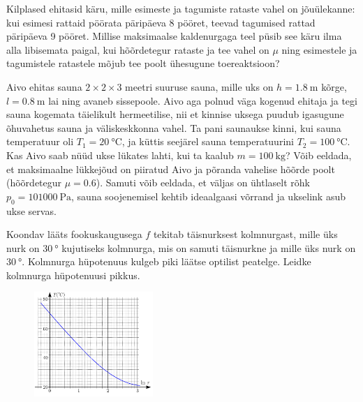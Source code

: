 \documentclass[10pt]{article}
\begin{document}

Kilplased ehitasid käru, mille esimeste ja tagumiste rataste vahel on jõuülekanne: kui esimesi rattaid pöörata päripäeva 8 pööret, teevad tagumised rattad päripäeva 9 pööret. Millise maksimaalse kaldenurgaga teel püsib see käru ilma alla libisemata paigal, kui hõõrdetegur rataste ja tee vahel on  $\mu$ ning esimestele ja tagumistele ratastele mõjub tee poolt ühesugune  toereaktsioon?
\probend
\bigskip


Aivo ehitas sauna $2\times 2\times 3$ meetri suuruse sauna, mille uks on $h=\SI{1.8}{\m}$ kõrge, $l=\SI{0.8}{\m}$ lai ning avaneb sissepoole. Aivo aga polnud väga kogenud ehitaja ja tegi sauna kogemata täielikult hermeetilise, nii et kinnise uksega puudub igasugune õhuvahetus sauna ja väliskeskkonna vahel. Ta pani saunaukse kinni, kui sauna temperatuur oli $T_1 = \SI{20}{\celsius}$, ja küttis seejärel sauna temperatuurini $T_2 = \SI{100}{\celsius}$. Kas Aivo saab nüüd ukse lükates lahti, kui ta kaalub $m=\SI{100}{\kg}$? Võib eeldada, et maksimaalne lükkejõud on piiratud Aivo ja põranda vahelise hõõrde poolt (hõõrdetegur $\mu=\num{0.6}$). Samuti võib eeldada, et väljas on ühtlaselt rõhk $p_0=\SI{101 000}{\Pa}$, sauna soojenemisel kehtib ideaalgaasi võrrand ja ukselink asub ukse servas.
\probend
\bigskip


Koondav lääts fookuskaugusega $f$ tekitab täisnurksest kolmnurgast, mille üks nurk on $\SI{30}{\degree}$ kujutiseks kolmnurga, mis on samuti täisnurkne ja mille üks nurk on  $\SI{30}{\degree}$. Kolmnurga hüpotenuus kulgeb piki läätse optilist peatelge. Leidke kolmnurga hüpotenuusi pikkus.
\probend
\bigskip


\begin{figure}
	\vspace{-20pt}
	\begin{center}
		\includegraphics[width = 0.4\textwidth]{2018-lahg-09-yl.pdf}
	\end{center}
\end{figure}
\end{document}
